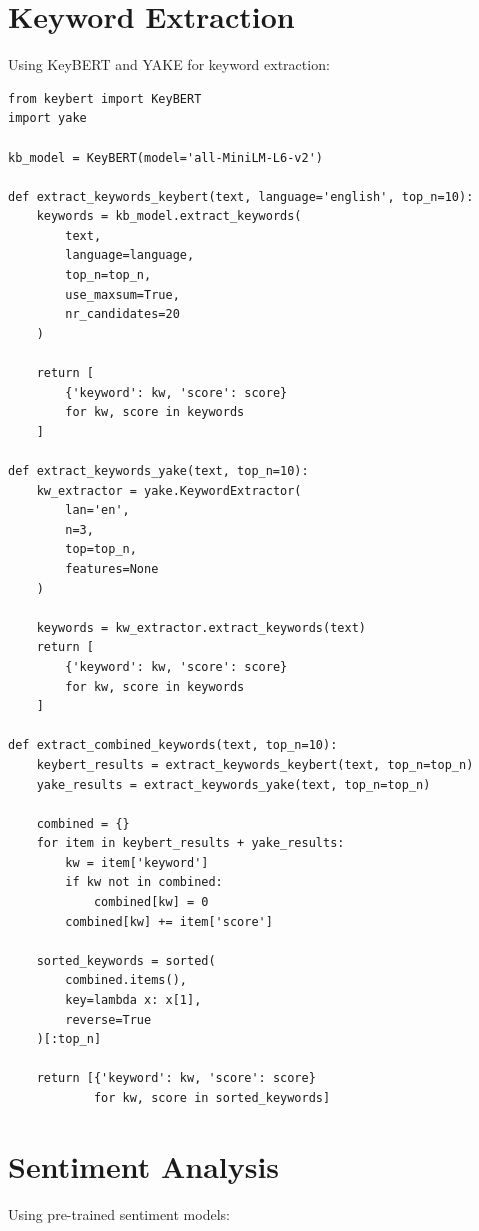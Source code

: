 \documentclass[12pt,a4paper]{report}
\begin{document}
\section{Keyword Extraction}

Using KeyBERT and YAKE for keyword extraction:

\begin{lstlisting}
from keybert import KeyBERT
import yake

kb_model = KeyBERT(model='all-MiniLM-L6-v2')

def extract_keywords_keybert(text, language='english', top_n=10):
    keywords = kb_model.extract_keywords(
        text,
        language=language,
        top_n=top_n,
        use_maxsum=True,
        nr_candidates=20
    )
    
    return [
        {'keyword': kw, 'score': score}
        for kw, score in keywords
    ]

def extract_keywords_yake(text, top_n=10):
    kw_extractor = yake.KeywordExtractor(
        lan='en',
        n=3,
        top=top_n,
        features=None
    )
    
    keywords = kw_extractor.extract_keywords(text)
    return [
        {'keyword': kw, 'score': score}
        for kw, score in keywords
    ]

def extract_combined_keywords(text, top_n=10):
    keybert_results = extract_keywords_keybert(text, top_n=top_n)
    yake_results = extract_keywords_yake(text, top_n=top_n)
    
    combined = {}
    for item in keybert_results + yake_results:
        kw = item['keyword']
        if kw not in combined:
            combined[kw] = 0
        combined[kw] += item['score']
    
    sorted_keywords = sorted(
        combined.items(),
        key=lambda x: x[1],
        reverse=True
    )[:top_n]
    
    return [{'keyword': kw, 'score': score}
            for kw, score in sorted_keywords]
\end{lstlisting}

\section{Sentiment Analysis}

Using pre-trained sentiment models:
\end{document}

